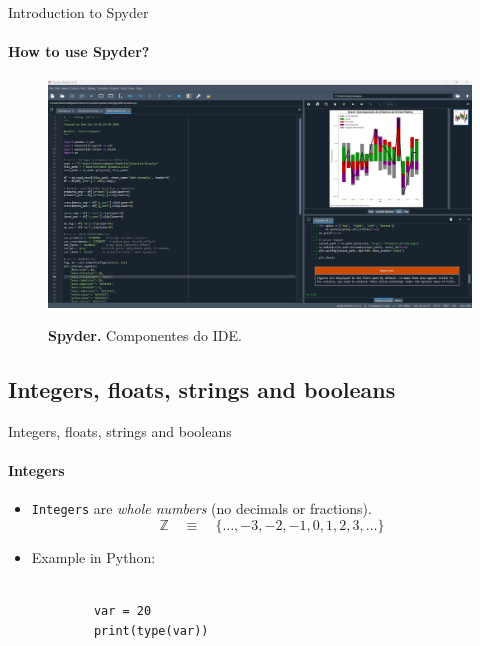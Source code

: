 \documentclass[notes,11pt, aspectratio=169, xcolor=table]{beamer}
\begin{document}
    \begin{frame}{Introduction to Spyder}
    \framesubtitle{How to use Spyder?}
        
        \begin{figure}
            \begin{center}
                \colorbox{white}{
                    \includegraphics[scale=0.2]{figs/spyder.PNG} 
                }
            \end{center}
            \caption[Diagrama de Conway]{\textbf{Spyder.} Componentes do IDE. \label{fig:spyder}}
        \end{figure}  

    
   

    \end{frame}

\subsection{Integers, floats, strings and booleans}  

    \begin{frame}[fragile=singleslide]{Integers, floats, strings and booleans}
    \framesubtitle{Integers}

        \begin{itemize}
            \item \texttt{Integers} are \textit{whole numbers} (no decimals or fractions).
            \begin{equation}
                \mathbb{Z} \quad \equiv \quad \{ \hdots, -3, -2, -1, 0, 1, 2, 3, \hdots \}
            \end{equation}
             
            \item Example in Python:
        \end{itemize}

        \begin{verbatim}
        
            var = 20
            print(type(var))
        \end{verbatim}    
   

    \end{frame}
    
\end{document}
